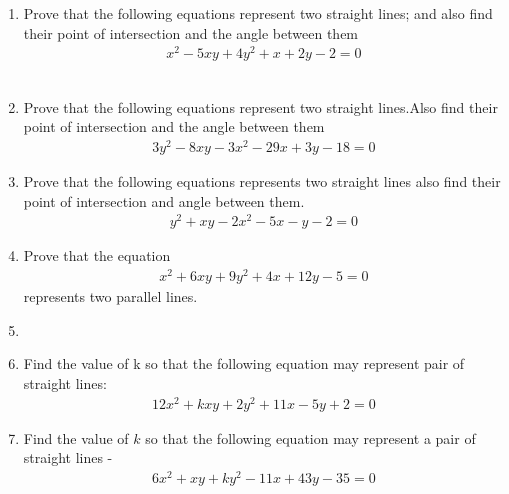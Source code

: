 \renewcommand{\theequation}{\theenumi}
\renewcommand{\thefigure}{\theenumi}
\begin{enumerate}[label=\thesubsection.\arabic*.,ref=\thesubsection.\theenumi]
%
\item Prove that the following equations represent two straight lines; and also find their point of intersection and the angle between them
\begin{align}\nonumber
    x^2-5xy+4y^2+x+2y-2=0
\end{align}
\\
\solution

\item Prove that the following equations represent two straight lines.Also find their point of intersection and the angle between them
\begin{align}
 3y^2-8xy-3x^2-29x+3y-18=0   
\label{eq:solutions/13/3/1}
\end{align}
\solution

\item Prove that the following equations represents two straight lines also find their point of intersection and angle between them.
\begin{align}
y^2+xy-2x^2-5x-y-2=0
\end{align}
%
\solution

\item Prove that the equation
\begin{align} 
    x^{2}+6xy+9y^{2}+4x+12y-5=0 \label{eq:solutions/13/5/eq:0}
\end{align}
represents two parallel lines.

\solution

\item 
%
\solution

\item Find the value of k so that the following equation may represent pair of straight lines: 
\begin{align}
    12x^2+kxy+2y^2+11x-5y+2=0\label{eq:solutions/13/8/1.1}
\end{align}
\solution

%
\item Find the value of $k$ so that the following equation may represent a pair of straight lines - 
\begin{align}
6x^2 +xy+ky^2-11x+43y-35 = 0 \label{eq:solutions/13/94}
\end{align}
\solution



\end{enumerate}
